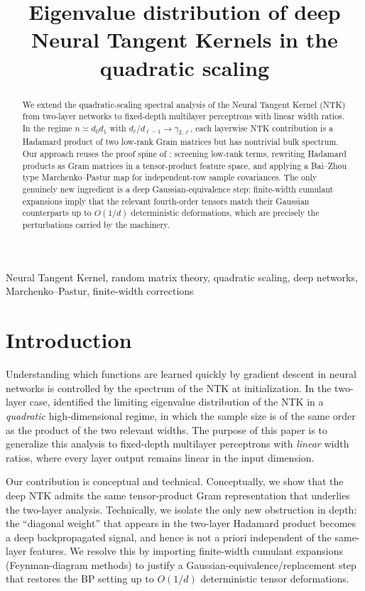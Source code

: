 \documentclass[anon]{colt2026}
\title[Deep NTK in quadratic scaling]{Eigenvalue distribution of deep Neural Tangent Kernels in the quadratic scaling}
\begin{document}
\maketitle

\begin{abstract}
We extend the quadratic-scaling spectral analysis of the Neural Tangent Kernel (NTK) from two-layer networks to fixed-depth multilayer perceptrons with linear width ratios.
In the regime $n\asymp d_0 d_1$ with $d_\ell/d_{\ell-1}\to \gamma_{2,\ell}$, each layerwise NTK contribution is a Hadamard product of two low-rank Gram matrices but has nontrivial bulk spectrum.
Our approach reuses the proof spine of \citet{benigni2025eigenvaluedistributionneuraltangent}: screening low-rank terms, rewriting Hadamard products as Gram matrices in a tensor-product feature space, and applying a Bai--Zhou type Marchenko--Pastur map for independent-row sample covariances.
The only genuinely new ingredient is a deep Gaussian-equivalence step: finite-width cumulant expansions \citep{guillen2025finitewidthneuraltangentkernels} imply that the relevant fourth-order tensors match their Gaussian counterparts up to $O(1/d)$ deterministic deformations, which are precisely the perturbations carried by the \citet{benigni2025eigenvaluedistributionneuraltangent} machinery.
\end{abstract}

\begin{keywords}
Neural Tangent Kernel, random matrix theory, quadratic scaling, deep networks, Marchenko--Pastur, finite-width corrections
\end{keywords}

\section{Introduction}
Understanding which functions are learned quickly by gradient descent in neural networks is controlled by the spectrum of the NTK at initialization.
In the two-layer case, \citet{benigni2025eigenvaluedistributionneuraltangent} identified the limiting eigenvalue distribution of the NTK in a \emph{quadratic} high-dimensional regime, in which the sample size is of the same order as the product of the two relevant widths.
The purpose of this paper is to generalize this analysis to fixed-depth multilayer perceptrons with \emph{linear} width ratios, where every layer output remains linear in the input dimension.

Our contribution is conceptual and technical.
Conceptually, we show that the deep NTK admits the same tensor-product Gram representation that underlies the two-layer analysis.
Technically, we isolate the only new obstruction in depth: the ``diagonal weight'' that appears in the two-layer Hadamard product becomes a deep backpropagated signal, and hence is not a priori independent of the same-layer features.
We resolve this by importing finite-width cumulant expansions (Feynman-diagram methods) to justify a Gaussian-equivalence/replacement step that restores the BP setting up to $O(1/d)$ deterministic tensor deformations.
\end{document}
